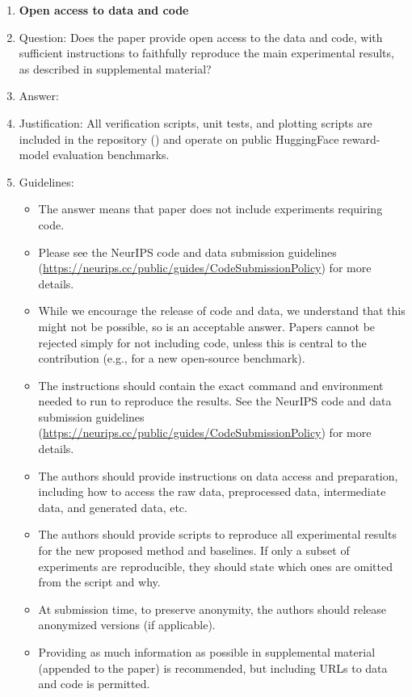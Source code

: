 \documentclass{article}
\theoremstyle{plain}
\theoremstyle{definition}
\theoremstyle{remark}
\begin{document}
\begin{enumerate}
\item {\bf Open access to data and code}
    \item[] Question: Does the paper provide open access to the data and code, with sufficient instructions to faithfully reproduce the main experimental results, as described in supplemental material?
    \item[] Answer: \answerYes{}
    \item[] Justification: All verification scripts, unit tests, and plotting scripts are included in the repository () and operate on public HuggingFace reward-model evaluation benchmarks.
    \item[] Guidelines:
    \begin{itemize}
        \item The answer \answerNA{} means that paper does not include experiments requiring code.
        \item Please see the NeurIPS code and data submission guidelines (\url{https://neurips.cc/public/guides/CodeSubmissionPolicy}) for more details.
        \item While we encourage the release of code and data, we understand that this might not be possible, so \answerNo{} is an acceptable answer. Papers cannot be rejected simply for not including code, unless this is central to the contribution (e.g., for a new open-source benchmark).
        \item The instructions should contain the exact command and environment needed to run to reproduce the results. See the NeurIPS code and data submission guidelines (\url{https://neurips.cc/public/guides/CodeSubmissionPolicy}) for more details.
        \item The authors should provide instructions on data access and preparation, including how to access the raw data, preprocessed data, intermediate data, and generated data, etc.
        \item The authors should provide scripts to reproduce all experimental results for the new proposed method and baselines. If only a subset of experiments are reproducible, they should state which ones are omitted from the script and why.
        \item At submission time, to preserve anonymity, the authors should release anonymized versions (if applicable).
        \item Providing as much information as possible in supplemental material (appended to the paper) is recommended, but including URLs to data and code is permitted.
    \end{itemize}


\end{enumerate}
\end{document}
